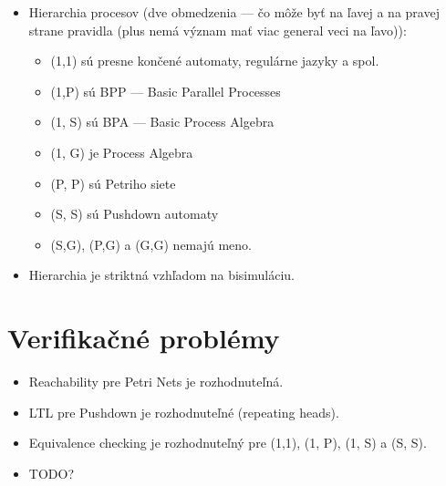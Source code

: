 \documentclass[paper=a4, fontsize=11pt]{scrartcl} %
\numberwithin{equation}{section} %
\numberwithin{figure}{section} %
\numberwithin{table}{section} %
\begin{document}
\begin{itemize}
		\item Hierarchia procesov (dve obmedzenia — čo môže byť na ľavej a na pravej strane pravidla (plus nemá význam mať viac general veci na ľavo)):
		
		\begin{itemize}
			\item (1,1) sú presne končené automaty, regulárne jazyky a spol.
			\item (1,P) sú BPP — Basic Parallel Processes
			\item (1, S) sú BPA — Basic Process Algebra
			\item (1, G) je Process Algebra
			\item (P, P) sú Petriho siete
			\item (S, S) sú Pushdown automaty
			\item (S,G), (P,G) a (G,G) nemajú meno.						
		\end{itemize}
		
		\item Hierarchia je striktná vzhľadom na bisimuláciu.
		
	\end{itemize}

	\section{Verifikačné problémy}

	\begin{itemize}
		\item Reachability pre Petri Nets je rozhodnuteľná. 
		\item LTL pre Pushdown je rozhodnuteľné (repeating heads).
		\item Equivalence checking je rozhodnuteľný pre (1,1), (1, P), (1, S) a (S, S).
		\item TODO?
	\end{itemize}
\end{document}
